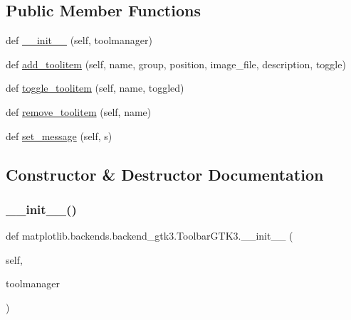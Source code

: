 \subsection*{Public Member Functions}
\begin{DoxyCompactItemize}
\item 
def \hyperlink{classmatplotlib_1_1backends_1_1backend__gtk3_1_1ToolbarGTK3_ac9d8609070179fe1038c85b5b309d4fa}{\+\_\+\+\_\+init\+\_\+\+\_\+} (self, toolmanager)
\item 
def \hyperlink{classmatplotlib_1_1backends_1_1backend__gtk3_1_1ToolbarGTK3_aad8efc186352c0eeeab7c3fb4e3f3566}{add\+\_\+toolitem} (self, name, group, position, image\+\_\+file, description, toggle)
\item 
def \hyperlink{classmatplotlib_1_1backends_1_1backend__gtk3_1_1ToolbarGTK3_a47a6002cdc824e837f6da7f2bcd2ed10}{toggle\+\_\+toolitem} (self, name, toggled)
\item 
def \hyperlink{classmatplotlib_1_1backends_1_1backend__gtk3_1_1ToolbarGTK3_a9846ff81d3ecd58ce0fe9c8ba37b48d2}{remove\+\_\+toolitem} (self, name)
\item 
def \hyperlink{classmatplotlib_1_1backends_1_1backend__gtk3_1_1ToolbarGTK3_a11a94dda14908b4f2c82045047cf760c}{set\+\_\+message} (self, s)
\end{DoxyCompactItemize}


\subsection{Constructor \& Destructor Documentation}
\mbox{\label{classmatplotlib_1_1backends_1_1backend__gtk3_1_1ToolbarGTK3_ac9d8609070179fe1038c85b5b309d4fa}} 
\subsubsection{\texorpdfstring{\+\_\+\+\_\+init\+\_\+\+\_\+()}{\_\_init\_\_()}}
{\footnotesize\ttfamily def matplotlib.\+backends.\+backend\+\_\+gtk3.\+Toolbar\+G\+T\+K3.\+\_\+\+\_\+init\+\_\+\+\_\+ (\begin{DoxyParamCaption}\item[{}]{self,  }\item[{}]{toolmanager }\end{DoxyParamCaption})}



